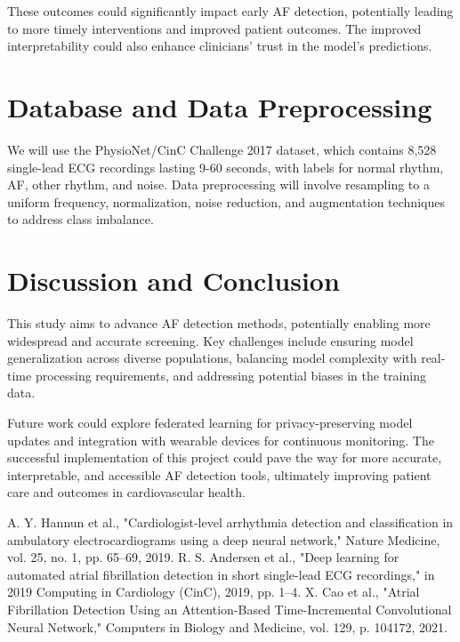 \documentclass[conference]{IEEEtran}
\begin{document}
These outcomes could significantly impact early AF detection, potentially leading to more timely interventions and improved patient outcomes. The improved interpretability could also enhance clinicians' trust in the model's predictions.

\section{Database and Data Preprocessing}
We will use the PhysioNet/CinC Challenge 2017 dataset, which contains 8,528 single-lead ECG recordings lasting 9-60 seconds, with labels for normal rhythm, AF, other rhythm, and noise. Data preprocessing will involve resampling to a uniform frequency, normalization, noise reduction, and augmentation techniques to address class imbalance.

\section{Discussion and Conclusion}
This study aims to advance AF detection methods, potentially enabling more widespread and accurate screening. Key challenges include ensuring model generalization across diverse populations, balancing model complexity with real-time processing requirements, and addressing potential biases in the training data.

Future work could explore federated learning for privacy-preserving model updates and integration with wearable devices for continuous monitoring. The successful implementation of this project could pave the way for more accurate, interpretable, and accessible AF detection tools, ultimately improving patient care and outcomes in cardiovascular health.

\begin{thebibliography}{3}
     A. Y. Hannun et al., "Cardiologist-level arrhythmia detection and classification in ambulatory electrocardiograms using a deep neural network," Nature Medicine, vol. 25, no. 1, pp. 65–69, 2019.
     R. S. Andersen et al., "Deep learning for automated atrial fibrillation detection in short single-lead ECG recordings," in 2019 Computing in Cardiology (CinC), 2019, pp. 1–4.
     X. Cao et al., "Atrial Fibrillation Detection Using an Attention-Based Time-Incremental Convolutional Neural Network," Computers in Biology and Medicine, vol. 129, p. 104172, 2021.
\end{thebibliography}
\end{document}
